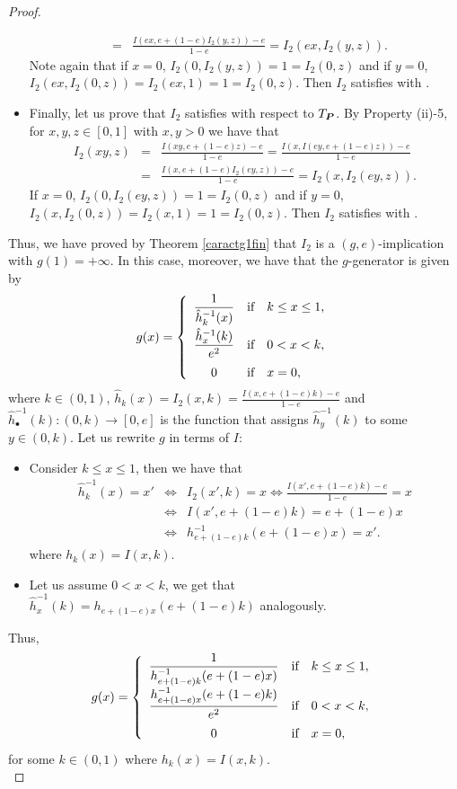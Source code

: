 \begin{proof}
\begin{itemize}
\begin{eqnarray*}
			&=& \frac{I(ex,e+(1-e)I_2(y,z))-e}{1-e} = I_2(ex,I_2(y,z)).
		\end{eqnarray*}
		Note again that if $x=0$, $I_2(0,I_2(y,z))=1=I_2(0,z)$ and if $y=0$, $I_2(ex,I_2(0,z))=I_2(ex,1)=1=I_2(0,z)$. Then $I_2$ satisfies \LIex with \TP.
		\item Finally, let us prove that $I_2$ satisfies \LIey with respect to $T_{\bm{P}}$. By Property (ii)-5, for $x,y,z \in [0,1]$ with $x,y>0$ we have that
		\begin{eqnarray*}
			I_2(xy,z)&=& \frac{I(xy,e+(1-e)z)-e}{1-e} =\frac{I(x,I(ey,e+(1-e)z))-e}{1-e} \\
			&=&\frac{I(x,e+(1-e)I_2(ey,z))-e}{1-e} = I_2(x,I_2(ey,z)).
		\end{eqnarray*}
		If $x=0$, $I_2(0,I_2(ey,z))=1=I_2(0,z)$ and if $y=0$, $I_2(x,I_2(0,z))=I_2(x,1)=1=I_2(0,z)$. Then $I_2$ satisfies \LIey with \TP.
	\end{itemize}
	Thus, we have proved by Theorem \ref{caractg1fin} that $I_2$ is a $(g,e)$-implication with $g(1)=+ \infty$. In this case, moreover, we have that the $g$-generator is given by
	$$g(x)=\left\{ \begin{array}{ccl}
		\displaystyle \frac{1}{\hat{h}_k^{-1}(x)} &   \hbox{if}  & k \leq x \leq 1, \\[1em]
		\displaystyle\frac{\hat{h}_x^{-1}(k)}{e^2} &  \hbox{if} & 0<x<k, \\[1em]
		0 &  \hbox{if} & x=0, 
	\end{array}
	\right.
	$$
	where $k\in(0,1)$, $\hat{h}_k(x)=I_2(x,k)=\frac{I(x,e+(1-e)k)-e}{1-e}$ and $\hat{h}_{\bullet}^{-1}(k):(0,k)\to [0,e]$ is the function that assigns $\hat{h}_y^{-1}(k)$ to some $ y \in (0,k)$. Let us rewrite $g$ in terms of $I$:
	\begin{itemize}
		\item  Consider $ k \leq x \leq 1$, then we have that
		\begin{eqnarray*}
			\hat{h}_k^{-1}(x)=x' &\Leftrightarrow & I_2(x',k)=x \Leftrightarrow \frac{I(x',e+(1-e)k)-e}{1-e}=x \\
			&\Leftrightarrow& I(x',e+(1-e)k)=e+(1-e)x  \\
			&\Leftrightarrow&  h^{-1}_{e+(1-e)k}(e+(1-e)x)=x'.
		\end{eqnarray*}
		where $h_k(x)=I(x,k)$.
		\item Let us assume $0<x<k$, we get that $\hat{h}_x^{-1}(k)=h_{e+(1-e)x}(e+(1-e)k)$ analogously.
	\end{itemize}
	Thus,
	$$g(x)=\left\{ \begin{array}{ccl}
		\displaystyle \frac{1}{h_{e+(1-e)k}^{-1}(e+(1-e)x)} &   \hbox{if}  & k \leq x \leq 1, \\[1em]
		\displaystyle \frac{h_{e+(1-e)x}^{-1}(e+(1-e)k)}{e^2} &  \hbox{if} & 0<x<k, \\[1em]
		0 &  \hbox{if} & x=0, 
	\end{array}
	\right.
	$$
	for some $k \in (0,1)$ where $h_k(x)=I(x,k)$.\\
	

\end{proof}
